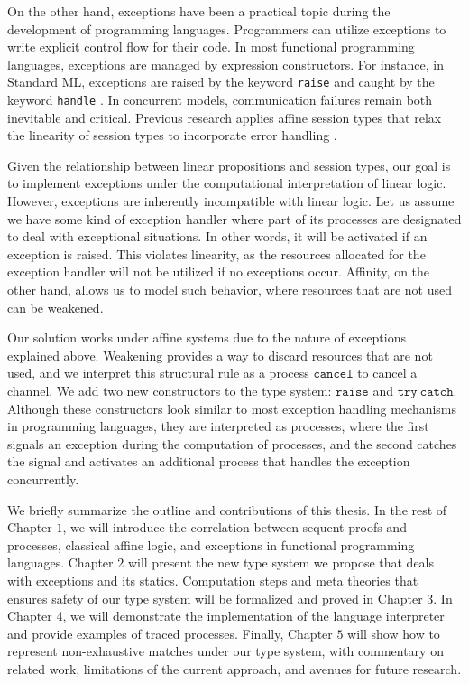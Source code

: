 \documentclass[12pt, openany]{memoir}
\begin{document}
On the other hand, exceptions have been a practical topic during the development of programming languages.
Programmers can utilize exceptions to write explicit control flow for their code. In most functional programming languages, exceptions are managed by expression constructors. 
For instance, in Standard ML, exceptions are raised by the keyword \texttt{raise} and caught by the keyword \texttt{handle} \cite{Milner1997}. 
In concurrent models, communication failures remain both inevitable and critical. 
Previous research applies affine session types that relax the linearity of session types to incorporate error handling \cite{Mos2014}.

Given the relationship between linear propositions and session types, our goal is to implement exceptions under the computational interpretation of linear logic.
However, exceptions are inherently incompatible with linear logic. 
Let us assume we have some kind of exception handler where part of its processes are designated to deal with exceptional situations. 
In other words, it will be activated if an exception is raised. 
This violates linearity, as the resources allocated for the exception handler will not be utilized if no exceptions occur. 
Affinity, on the other hand, allows us to model such behavior, where resources that are not used can be weakened.

Our solution works under affine systems due to the nature of exceptions explained above. 
Weakening provides a way to discard resources that are not used, and we interpret this structural rule as a process $\texttt{cancel}$ to cancel a channel. 
We add two new constructors to the type system: $\texttt{raise}$ and $\texttt{try}\ \texttt{catch}$. 
Although these constructors look similar to most exception handling mechanisms in programming languages, 
they are interpreted as processes, where the first signals an exception during the computation of processes,
and the second catches the signal and activates an additional process that handles the exception concurrently.

We briefly summarize the outline and contributions of this thesis.
In the rest of Chapter $1$, we will introduce the correlation between sequent proofs and processes, classical affine logic, and exceptions in functional programming languages.
Chapter $2$ will present the new type system we propose that deals with exceptions and its statics.
Computation steps and meta theories that ensures safety of our type system will be formalized and proved in Chapter $3$. 
In Chapter 4, we will demonstrate the implementation of the language interpreter and provide examples of traced processes.
Finally, Chapter $5$ will show how to represent non-exhaustive matches under our type system, with commentary on related work, limitations of the current approach, and avenues for future research.
\end{document}
